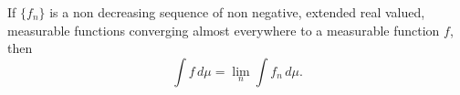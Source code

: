 If $\{f_n\}$ is a non decreasing sequence of non negative, extended real valued, measurable functions converging almost everywhere to a measurable function $f$, then
$$\int f \,d\mu = \lim_n \int f_n \,d\mu.$$
